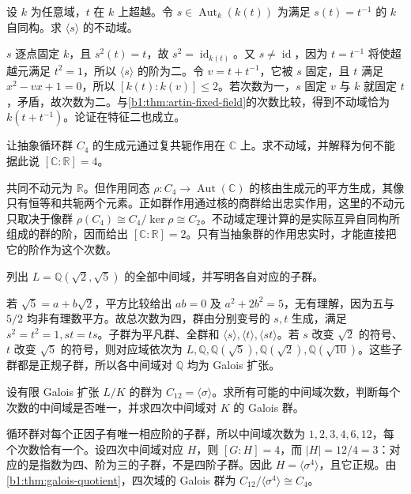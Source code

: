 \begin{exercise}\label{b1:ex:19-rational-inversion}
	设 \(k\) 为任意域，\(t\) 在 \(k\) 上超越。令 \(s\in\operatorname{Aut}_k(k(t))\) 为满足 \(s(t)=t^{-1}\) 的 \(k\) 自同构。求 \(\langle s\rangle\) 的不动域。
\end{exercise}
\begin{solution}
	\(s\) 逐点固定 \(k\)，且 \(s^2(t)=t\)，故 \(s^2=\operatorname{id}_{k(t)}\)。又 \(s\ne\operatorname{id}\)，因为 \(t=t^{-1}\) 将使超越元满足 \(t^2=1\)，所以 \(\langle s\rangle\) 的阶为二。令 \(v=t+t^{-1}\)，它被 \(s\) 固定，且 \(t\) 满足 \(x^2-vx+1=0\)，所以 \([k(t):k(v)]\leq2\)。若次数为一，\(s\) 固定 \(v\) 与 \(k\) 就固定 \(t\)，矛盾，故次数为二。与\cref{b1:thm:artin-fixed-field}的次数比较，得到不动域恰为 \(k(t+t^{-1})\)。论证在特征二也成立。
\end{solution}

\begin{exercise}\label{b1:ex:19-faithful-action}
	让抽象循环群 \(C_4\) 的生成元通过复共轭作用在 \(\mathbb C\) 上。求不动域，并解释为何不能据此说 \([\mathbb C:\mathbb R]=4\)。
\end{exercise}
\begin{solution}
	共同不动元为 \(\mathbb R\)。但作用同态 \(\rho:C_4\rightarrow\operatorname{Aut}(\mathbb C)\) 的核由生成元的平方生成，其像只有恒等和共轭两个元素。正如群作用通过核的商群给出忠实作用，这里的不动元只取决于像群 \(\rho(C_4)\cong C_4/\ker\rho\cong C_2\)。不动域定理计算的是实际互异自同构所组成的群的阶，因而给出 \([\mathbb C:\mathbb R]=2\)。只有当抽象群的作用忠实时，才能直接把它的阶作为这个次数。
\end{solution}

\begin{exercise}\label{b1:ex:19-biquadratic-five}
	列出 \(L=\mathbb Q(\sqrt2,\sqrt5)\) 的全部中间域，并写明各自对应的子群。
\end{exercise}
\begin{solution}
	若 \(\sqrt5=a+b\sqrt2\)，平方比较给出 \(ab=0\) 及 \(a^2+2b^2=5\)，无有理解，因为五与 \(5/2\) 均非有理数平方。故总次数为四，群由分别变号的 \(s,t\) 生成，满足 \(s^2=t^2=1,st=ts\)。子群为平凡群、全群和 \(\langle s\rangle,\langle t\rangle,\langle st\rangle\)。若 \(s\) 改变 \(\sqrt2\) 的符号、\(t\) 改变 \(\sqrt5\) 的符号，则对应域依次为 \(L,\mathbb Q,\mathbb Q(\sqrt5),\mathbb Q(\sqrt2),\mathbb Q(\sqrt{10})\)。这些子群都是正规子群，所以各中间域对 \(\mathbb Q\) 均为 Galois 扩张。
\end{solution}

\begin{exercise}\label{b1:ex:19-cyclic-twelve}
	设有限 Galois 扩张 \(L/K\) 的群为 \(C_{12}=\langle\sigma\rangle\)。求所有可能的中间域次数，判断每个次数的中间域是否唯一，并求四次中间域对 \(K\) 的 Galois 群。
\end{exercise}
\begin{solution}
	循环群对每个正因子有唯一相应阶的子群，所以中间域次数为 \(1,2,3,4,6,12\)，每个次数恰有一个。设四次中间域对应 \(H\)，则 \([G:H]=4\)，而 \(|H|=12/4=3\)：对应的是指数为四、阶为三的子群，不是四阶子群。因此 \(H=\langle\sigma^4\rangle\)，且它正规。由\cref{b1:thm:galois-quotient}，四次域的 Galois 群为 \(C_{12}/\langle\sigma^4\rangle\cong C_4\)。
\end{solution}

